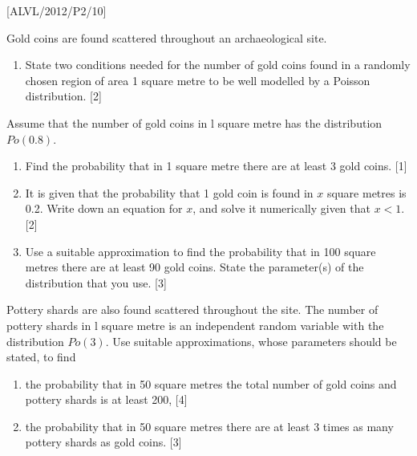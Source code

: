 \item {[}ALVL/2012/P2/10{]}

Gold coins are found scattered throughout an archaeological site. 
\begin{enumerate}
\item State two conditions needed for the number of gold coins found in
a randomly chosen region of area 1 square metre to be well modelled
by a Poisson distribution. {[}2{]} 
\end{enumerate}
Assume that the number of gold coins in l square metre has the distribution
$Po\left(0.8\right)$. 
\begin{enumerate}
\item Find the probability that in 1 square metre there are at least 3 gold
coins. {[}1{]} 
\item It is given that the probability that 1 gold coin is found in $x$
square metres is 0.2. Write down an equation for $x$, and solve it
numerically given that $x<1$. {[}2{]} 
\item Use a suitable approximation to find the probability that in 100 square
metres there are at least 90 gold coins. State the parameter(s) of
the distribution that you use. {[}3{]} 
\end{enumerate}
Pottery shards are also found scattered throughout the site. The number
of pottery shards in l square metre is an independent random variable
with the distribution $Po\left(3\right)$. Use suitable approximations,
whose parameters should be stated, to find 
\begin{enumerate}
\item the probability that in 50 square metres the total number of gold
coins and pottery shards is at least 200, {[}4{]} 
\item the probability that in 50 square metres there are at least 3 times
as many pottery shards as gold coins. {[}3{]}
\end{enumerate}
